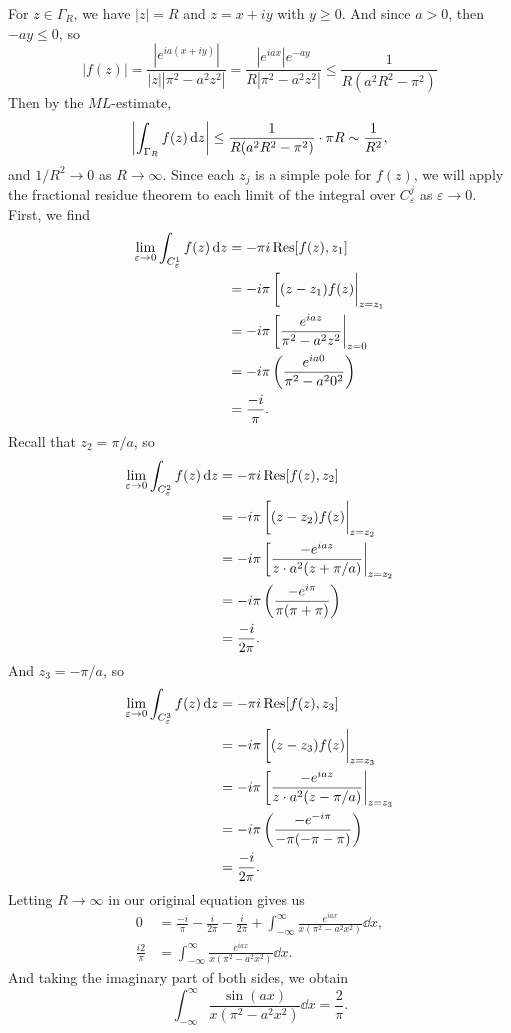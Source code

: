 \documentclass[12pt]{article}
\theoremstyle{definition}
\newcommand{\eps}{\varepsilon}
\newcommand{\pfrac}[2]{\left(\frac{#1}{#2}\right)}
\begin{document}
For $z \in \Gamma_R$, we have $|z| = R$ and $z = x + iy$ with $y \geq 0$. And since $a > 0$, then $-ay \leq 0$, so
\[
    |f(z)|
        = \frac{|e^{ia(x + iy)}|}{|z||\pi^2 - a^2z^2|}
        = \frac{|e^{iax}|e^{-ay}}{R|\pi^2 - a^2z^2|}
        \leq \frac{1}{R(a^2R^2 - \pi^2)}
\]
Then by the $ML$-estimate,
\[
    \qty|\int_{\Gamma_R} f(z) \dd{z}|
        \leq \frac{1}{R(a^2R^2 - \pi^2)} \cdot \pi R
        \sim \frac{1}{R^2},
\]
and $1/R^2 \to 0$ as $R \to \infty$. Since each $z_j$ is a simple pole for $f(z)$, we will apply the fractional residue theorem to each limit of the integral over $C_\eps^j$ as $\eps \to 0$. First, we find
\begin{align*}
    \lim_{\eps \to 0} \int_{C_\eps^1} f(z) \dd{z}
        &= -\pi i \Res[f(z), z_1] \\
        &= -i\pi \eval[(z - z_1) f(z)|_{z = z_1} \\
        &= -i\pi \eval[\frac{e^{iaz}}{\pi^2 - a^2z^2}|_{z = 0} \\
        &= -i\pi \pfrac{e^{ia0}}{\pi^2 - a^20^2} \\
        &= \frac{-i}{\pi}.
\end{align*}
Recall that $z_2 = \pi/a$, so
\begin{align*}
    \lim_{\eps \to 0} \int_{C_\eps^2} f(z) \dd{z}
        &= -\pi i \Res[f(z), z_2] \\
        &= -i\pi \eval[(z - z_2) f(z)|_{z = z_2} \\
        &= -i\pi \eval[\frac{-e^{iaz}}{z \cdot a^2 (z + \pi/a)}|_{z = z_2} \\
        &= -i\pi \pfrac{-e^{i\pi}}{\pi(\pi + \pi)} \\
        &= \frac{-i}{2\pi}.
\end{align*}
And $z_3 = -\pi/a$, so
\begin{align*}
    \lim_{\eps \to 0} \int_{C_\eps^3} f(z) \dd{z}
        &= -\pi i \Res[f(z), z_3] \\
        &= -i\pi \eval[(z - z_3) f(z)|_{z = z_3} \\
        &= -i\pi \eval[\frac{-e^{iaz}}{z \cdot a^2 (z - \pi/a)}|_{z = z_3} \\
        &= -i\pi \pfrac{-e^{-i\pi}}{-\pi(-\pi - \pi)} \\
        &= \frac{-i}{2\pi}.
\end{align*}
Letting $R \to \infty$ in our original equation gives us
\begin{align*}
    0 &= \frac{-i}{\pi} - \frac{i}{2\pi} - \frac{i}{2\pi} + \int_{-\infty}^{\infty} \frac{e^{iax}}{x(\pi^2 - a^2x^2)} \dd{x}, \\
    \frac{i2}{\pi} &= \int_{-\infty}^{\infty} \frac{e^{iax}}{x(\pi^2 - a^2x^2)} \dd{x}.
\end{align*}
And taking the imaginary part of both sides, we obtain
\[
    \int_{-\infty}^{\infty} \frac{\sin(ax)}{x(\pi^2 - a^2x^2)} \dd{x} = \frac{2}{\pi}.
\]
\end{document}
